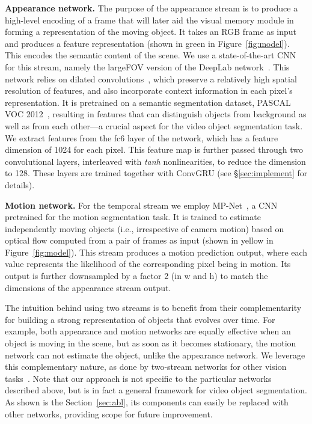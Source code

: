 \documentclass[10pt,twocolumn,letterpaper]{article}
\begin{document}
\noindent \textbf{Appearance network.}
The purpose of the appearance stream is to produce a high-level encoding of a
frame that will later aid the visual memory module in forming a representation
of the moving object. It takes an RGB frame as input and produces a  feature representation (shown in green in
Figure~\ref{fig:model}). This encodes the semantic content of the scene. We use
a state-of-the-art CNN for this stream, namely the largeFOV version of the
DeepLab network~\cite{chen2014semantic}. This network relies on dilated
convolutions~\cite{chen2014semantic}, which preserve a relatively high spatial
resolution of features, and also incorporate context information in each
pixel's representation. It is pretrained on a semantic segmentation dataset,
PASCAL VOC 2012~\cite{pascalvoc2012}, resulting in features that can
distinguish objects from background as well as from each other---a crucial
aspect for the video object segmentation task. We extract features from the fc6
layer of the network, which has a feature dimension of 1024 for each pixel.
This feature map is further passed through two  convolutional
layers, interleaved with \textit{tanh} nonlinearities, to reduce the dimension
to 128. These layers are trained together with ConvGRU (see
\S\ref{sec:implement} for details).

\noindent \textbf{Motion network.}
For the temporal stream we employ MP-Net~\cite{tokmakov2016learning}, a CNN
pretrained for the motion segmentation task. It is trained to estimate
independently moving objects (i.e., irrespective of camera motion) based on
optical flow computed from a pair of frames as input (shown in yellow in
Figure~\ref{fig:model}). This stream produces a 
motion prediction output, where each value represents the likelihood of the
corresponding pixel being in motion. Its output is further downsampled by a
factor 2 (in w and h) to match the dimensions of the appearance stream output.

The intuition behind using two streams is to benefit from their complementarity
for building a strong representation of objects that evolves over time. For
example, both appearance and motion networks are equally effective when an
object is moving in the scene, but as soon as it becomes stationary, the motion
network can not estimate the object, unlike the appearance network. We leverage
this complementary nature, as done by two-stream networks for other vision
tasks~\cite{simonyan2014two}. Note that our approach is not specific to the
particular networks described above, but is in fact a general framework for
video object segmentation. As shown is the Section~\ref{sec:abl}, its
components can easily be replaced with other networks, providing scope for
future improvement.
\end{document}
